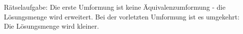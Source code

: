 Rätselaufgabe: Die erste Umformung ist keine Äquivalenzumformung - die Lösungsmenge wird erweitert. Bei der vorletzten Umformung ist es umgekehrt: Die Lösungsmenge wird kleiner.
